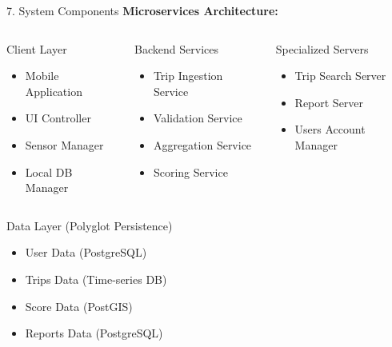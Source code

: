 \documentclass[aspectratio=169, 10pt]{beamer}
\begin{document}
\begin{frame}{7. System Components}
    \textbf{Microservices Architecture:}
    
    \vspace{0.3cm}
    \begin{columns}[T]
        \begin{block}{Client Layer}
            \begin{itemize}
                \item Mobile Application
                \item UI Controller
                \item Sensor Manager
                \item Local DB Manager
            \end{itemize}
        \end{block}
        
        \begin{block}{Backend Services}
            \begin{itemize}
                \item Trip Ingestion Service
                \item Validation Service
                \item Aggregation Service
                \item Scoring Service
            \end{itemize}
        \end{block}
        
        \begin{block}{Specialized Servers}
            \begin{itemize}
                \item Trip Search Server
                \item Report Server
                \item Users Account Manager
            \end{itemize}
        \end{block}
    \end{columns}
    
    \vspace{0.3cm}
    \begin{block}{Data Layer (Polyglot Persistence)}
        \begin{itemize}
            \item User Data (PostgreSQL)
            \item Trips Data (Time-series DB)
            \item Score Data (PostGIS)
            \item Reports Data (PostgreSQL)
        \end{itemize}
    \end{block}
\end{frame}
\end{document}
